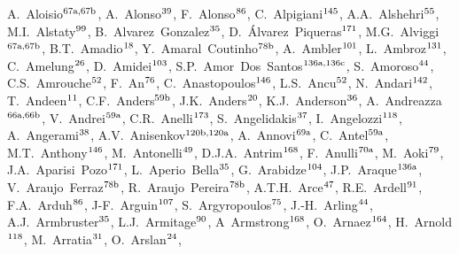 \begin{flushleft}
A.~Aloisio$^\textrm{\scriptsize 67a,67b}$,    
A.~Alonso$^\textrm{\scriptsize 39}$,    
F.~Alonso$^\textrm{\scriptsize 86}$,    
C.~Alpigiani$^\textrm{\scriptsize 145}$,    
A.A.~Alshehri$^\textrm{\scriptsize 55}$,    
M.I.~Alstaty$^\textrm{\scriptsize 99}$,    
B.~Alvarez~Gonzalez$^\textrm{\scriptsize 35}$,    
D.~\'{A}lvarez~Piqueras$^\textrm{\scriptsize 171}$,    
M.G.~Alviggi$^\textrm{\scriptsize 67a,67b}$,    
B.T.~Amadio$^\textrm{\scriptsize 18}$,    
Y.~Amaral~Coutinho$^\textrm{\scriptsize 78b}$,    
A.~Ambler$^\textrm{\scriptsize 101}$,    
L.~Ambroz$^\textrm{\scriptsize 131}$,    
C.~Amelung$^\textrm{\scriptsize 26}$,    
D.~Amidei$^\textrm{\scriptsize 103}$,    
S.P.~Amor~Dos~Santos$^\textrm{\scriptsize 136a,136c}$,    
S.~Amoroso$^\textrm{\scriptsize 44}$,    
C.S.~Amrouche$^\textrm{\scriptsize 52}$,    
F.~An$^\textrm{\scriptsize 76}$,    
C.~Anastopoulos$^\textrm{\scriptsize 146}$,    
L.S.~Ancu$^\textrm{\scriptsize 52}$,    
N.~Andari$^\textrm{\scriptsize 142}$,    
T.~Andeen$^\textrm{\scriptsize 11}$,    
C.F.~Anders$^\textrm{\scriptsize 59b}$,    
J.K.~Anders$^\textrm{\scriptsize 20}$,    
K.J.~Anderson$^\textrm{\scriptsize 36}$,    
A.~Andreazza$^\textrm{\scriptsize 66a,66b}$,    
V.~Andrei$^\textrm{\scriptsize 59a}$,    
C.R.~Anelli$^\textrm{\scriptsize 173}$,    
S.~Angelidakis$^\textrm{\scriptsize 37}$,    
I.~Angelozzi$^\textrm{\scriptsize 118}$,    
A.~Angerami$^\textrm{\scriptsize 38}$,    
A.V.~Anisenkov$^\textrm{\scriptsize 120b,120a}$,    
A.~Annovi$^\textrm{\scriptsize 69a}$,    
C.~Antel$^\textrm{\scriptsize 59a}$,    
M.T.~Anthony$^\textrm{\scriptsize 146}$,    
M.~Antonelli$^\textrm{\scriptsize 49}$,    
D.J.A.~Antrim$^\textrm{\scriptsize 168}$,    
F.~Anulli$^\textrm{\scriptsize 70a}$,    
M.~Aoki$^\textrm{\scriptsize 79}$,    
J.A.~Aparisi~Pozo$^\textrm{\scriptsize 171}$,    
L.~Aperio~Bella$^\textrm{\scriptsize 35}$,    
G.~Arabidze$^\textrm{\scriptsize 104}$,    
J.P.~Araque$^\textrm{\scriptsize 136a}$,    
V.~Araujo~Ferraz$^\textrm{\scriptsize 78b}$,    
R.~Araujo~Pereira$^\textrm{\scriptsize 78b}$,    
A.T.H.~Arce$^\textrm{\scriptsize 47}$,    
R.E.~Ardell$^\textrm{\scriptsize 91}$,    
F.A.~Arduh$^\textrm{\scriptsize 86}$,    
J-F.~Arguin$^\textrm{\scriptsize 107}$,    
S.~Argyropoulos$^\textrm{\scriptsize 75}$,    
J.-H.~Arling$^\textrm{\scriptsize 44}$,    
A.J.~Armbruster$^\textrm{\scriptsize 35}$,    
L.J.~Armitage$^\textrm{\scriptsize 90}$,    
A~Armstrong$^\textrm{\scriptsize 168}$,    
O.~Arnaez$^\textrm{\scriptsize 164}$,    
H.~Arnold$^\textrm{\scriptsize 118}$,    
M.~Arratia$^\textrm{\scriptsize 31}$,    
O.~Arslan$^\textrm{\scriptsize 24}$,    

\end{flushleft}
